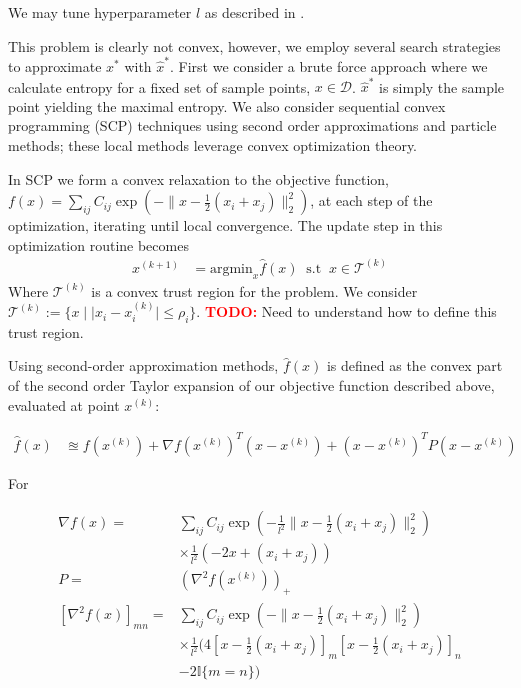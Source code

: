 \documentclass[10pt,twocolumn,letterpaper]{article}
\begin{document}
We may tune hyperparameter $l$ as described in \cite{Rasmussen}.

This problem is clearly not convex, however, we employ several search strategies to approximate $x^*$ with $\hat{x}^*$. First we consider a brute force approach where we calculate entropy for a fixed set of sample points, $x \in \mathcal{D}$. $\hat{x}^*$ is simply the sample point yielding the maximal entropy. We also consider sequential convex programming (SCP) techniques using second order approximations and particle methods; these local methods leverage convex optimization theory.

In SCP we form a convex relaxation to the objective function, $f(x) =  \sum_{ij} C_{ij} \exp\left(-\lVert x - \frac{1}{2}(x_i + x_j)\rVert _2^2\right)$, at each step of the optimization, iterating until local convergence. The update step in this optimization routine becomes
\begin{align*}
    x^{(k+1)} &= \textrm{argmin}_x \hat{f}(x) \;\; \textrm{s.t} \;\; x \in \mathcal{T}^{(k)}
\end{align*}
Where $\mathcal{T}^{(k)}$ is a convex trust region for the problem. We consider $\mathcal{T}^{(k)} := \{x \mid \lvert x_i - x_i^{(k)}\rvert \leq \rho_i\}$. \textcolor{red}{\textbf{TODO:}} Need to understand how to define this trust region.

Using second-order approximation methods, $\hat{f}(x)$ is defined as the convex part of the second order Taylor expansion of our objective function described above, evaluated at point $x^{(k)}$:
\begin{small}
\begin{align*}
    \hat{f}(x) &\approxeq f(x^{(k)}) + \nabla f(x^{(k)})^T(x - x^{(k)}) + (x - x^{(k)})^T P (x - x^{(k)})
\end{align*}\end{small} 
For
\begin{small}\begin{align*}
    \nabla f(x) =& \sum_{ij} C_{ij} \exp\left(-\frac{1}{l^2}\lVert x - \frac{1}{2}(x_i + x_j)\rVert ^2_2 \right)\\
    &\times \frac{1}{l^2}\left(-2x + (x_i + x_j)\right)\\
    P =& \left(\nabla^2 f(x^{(k)})\right)_+\\
    \left[\nabla^2 f(x)\right]_{mn} =& \sum_{ij} C_{ij} \exp\left(-\lVert x - \frac{1}{2}(x_i + x_j)\rVert ^2_2 \right)\\
    &\times \frac{1}{l^2}(4 \left[x - \frac{1}{2}(x_i + x_j)\right]_m \left[x - \frac{1}{2}(x_i + x_j)\right]_n\\
    &-2\mathbb{I}\{m = n\})
\end{align*}\end{small}
\end{document}
